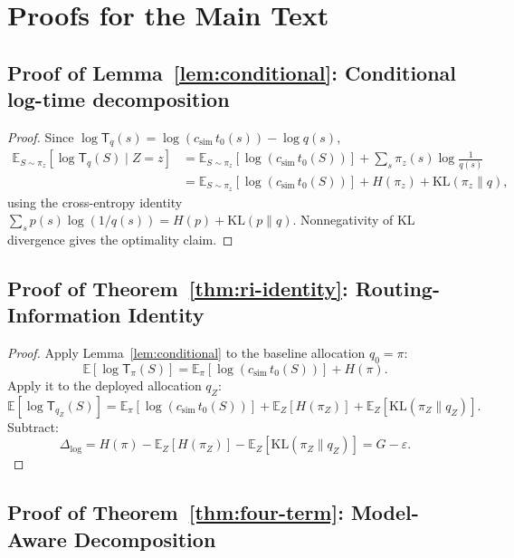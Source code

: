 \documentclass[10pt]{article}
\theoremstyle{paperplain}
\theoremstyle{paperdefinition}
\theoremstyle{paperremark}
\newcommand{\KL}{\mathrm{KL}}
\newcommand{\E}{\mathbb{E}}
\newcommand{\Dlog}{\Delta_{\log}}
\begin{document}
\section{Proofs for the Main Text}
\label{app:main-proofs}

\subsection{Proof of Lemma~\ref{lem:conditional}: Conditional log-time decomposition}
\label{app:proof:lem:conditional}

\begin{proof}
Since $\log \mathsf{T}_q(s) = \log(c_{\mathrm{sim}}\, t_0(s)) - \log q(s)$,
\[
\begin{aligned}
\E_{S \sim \pi_z}\!\left[\log \mathsf{T}_q(S) \mid Z=z\right]
&= \E_{S\sim\pi_z}[\log(c_{\mathrm{sim}}\, t_0(S))]
   + \sum_s \pi_z(s) \log \frac{1}{q(s)} \\
&= \E_{S\sim\pi_z}[\log(c_{\mathrm{sim}}\, t_0(S))]
   + H(\pi_z) + \KL(\pi_z \| q),
\end{aligned}
\]
using the cross-entropy identity $\sum_s p(s)\log(1/q(s)) = H(p) + \KL(p\|q)$.
Nonnegativity of KL divergence gives the optimality claim.
\end{proof}

\subsection{Proof of Theorem~\ref{thm:ri-identity}: Routing-Information Identity}
\label{app:proof:thm:ri-identity}

\begin{proof}
Apply Lemma~\ref{lem:conditional} to the baseline allocation $q_0 = \pi$:
\[
\E\!\left[\log \mathsf{T}_\pi(S)\right]
= \E_\pi[\log(c_{\mathrm{sim}}\, t_0(S))] + H(\pi).
\]
Apply it to the deployed allocation $q_Z$:
\[
\E\!\left[\log \mathsf{T}_{q_Z}(S)\right]
= \E_\pi[\log(c_{\mathrm{sim}}\, t_0(S))] + \E_Z[H(\pi_Z)] + \E_Z[\KL(\pi_Z \| q_Z)].
\]
Subtract:
\[
\Dlog = H(\pi) - \E_Z[H(\pi_Z)] - \E_Z[\KL(\pi_Z \| q_Z)]
= G - \varepsilon.
\]
\end{proof}

\subsection{Proof of Theorem~\ref{thm:four-term}: Model-Aware Decomposition}
\label{app:proof:thm:four-term}
\end{document}
